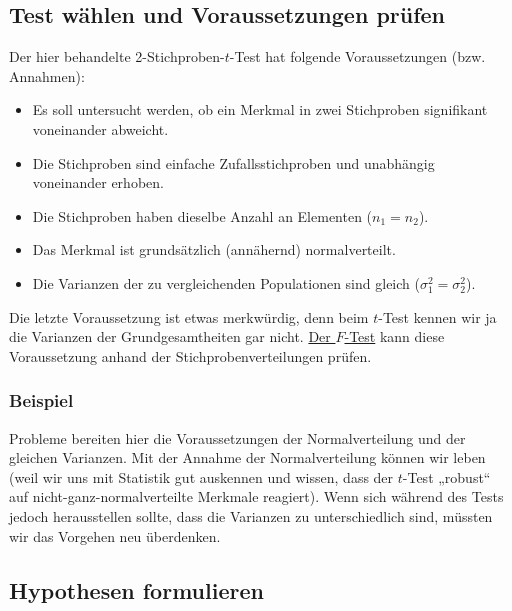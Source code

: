 \documentclass[
  11pt,
  ngerman,
  a4paper,
]{report}
\providecommand{\tightlist}{%
  \setlength{\itemsep}{0pt}\setlength{\parskip}{0pt}}
\begin{document}
\hypertarget{test-wuxe4hlen-und-voraussetzungen-pruxfcfen-2}{%
\subsection{Test wählen und Voraussetzungen prüfen}\label{test-wuxe4hlen-und-voraussetzungen-pruxfcfen-2}}

Der hier behandelte 2-Stichproben-\(t\)-Test hat folgende Voraussetzungen (bzw. Annahmen):

\begin{itemize}
\tightlist
\item
  Es soll untersucht werden, ob ein Merkmal in zwei Stichproben signifikant voneinander abweicht.
\item
  Die Stichproben sind einfache Zufallsstichproben und unabhängig voneinander erhoben.
\item
  Die Stichproben haben dieselbe Anzahl an Elementen (\(n_1=n_2\)).
\item
  Das Merkmal ist grundsätzlich (annähernd) normalverteilt.
\item
  Die Varianzen der zu vergleichenden Populationen sind gleich (\(\sigma^2_1=\sigma^2_2\)).
\end{itemize}

Die letzte Voraussetzung ist etwas merkwürdig, denn beim \(t\)-Test kennen wir ja die Varianzen der Grundgesamtheiten gar nicht. \protect\hyperlink{f-test}{Der \(F\)-Test} kann diese Voraussetzung anhand der Stichprobenverteilungen prüfen.

\hypertarget{beispiel-11}{%
\subsubsection{Beispiel}\label{beispiel-11}}

Probleme bereiten hier die Voraussetzungen der Normalverteilung und der gleichen Varianzen. Mit der Annahme der Normalverteilung können wir leben (weil wir uns mit Statistik gut auskennen und wissen, dass der \(t\)-Test „robust`` auf nicht-ganz-normalverteilte Merkmale reagiert). Wenn sich während des Tests jedoch herausstellen sollte, dass die Varianzen zu unterschiedlich sind, müssten wir das Vorgehen neu überdenken.

\hypertarget{hypothesen-formulieren-2}{%
\subsection{Hypothesen formulieren}\label{hypothesen-formulieren-2}}
\end{document}
